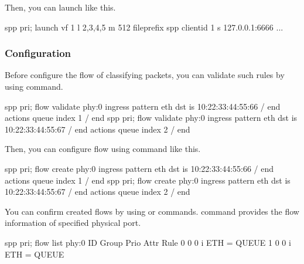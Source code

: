 \documentclass[a4paper,11pt,openany,oneside,english]{sphinxmanual}
\begin{document}
Then, you can launch  like this.

\begin{sphinxVerbatim}[commandchars=\\\{\},formatcom=\footnotesize]
spp \PYGZgt{} pri; launch vf 1 \PYGZhy{}l 2,3,4,5 \PYGZhy{}m 512 \PYGZhy{}\PYGZhy{}file\PYGZhy{}prefix spp \PYGZbs{}
\PYGZhy{}\PYGZhy{} \PYGZhy{}\PYGZhy{}client\PYGZhy{}id 1 \PYGZhy{}s 127.0.0.1:6666
...
\end{sphinxVerbatim}


\subsubsection{Configuration}
\label{\detokenize{usecases/hardware-offload:configuration}}
Before configure the flow of classifying packets, you
can validate such rules by using  command.

\begin{sphinxVerbatim}[commandchars=\\\{\},formatcom=\footnotesize]
spp \PYGZgt{} pri; flow validate phy:0 ingress pattern eth dst is \PYGZbs{}
10:22:33:44:55:66 / end actions queue index 1 / end
spp \PYGZgt{} pri; flow validate phy:0 ingress pattern eth dst is \PYGZbs{}
10:22:33:44:55:67 / end actions queue index 2 / end
\end{sphinxVerbatim}

Then, you can configure flow using  command like this.

\begin{sphinxVerbatim}[commandchars=\\\{\},formatcom=\footnotesize]
spp \PYGZgt{} pri; flow create phy:0 ingress pattern eth dst is \PYGZbs{}
10:22:33:44:55:66 / end actions queue index 1 / end
spp \PYGZgt{} pri; flow create phy:0 ingress pattern eth dst is \PYGZbs{}
10:22:33:44:55:67 / end actions queue index 2 / end
\end{sphinxVerbatim}

You can confirm created flows by using  or 
commands.  command provides the flow information of specified
physical port.

\begin{sphinxVerbatim}[commandchars=\\\{\},formatcom=\footnotesize]
spp \PYGZgt{} pri; flow list phy:0
ID      Group   Prio    Attr    Rule
0       0       0       i\PYGZhy{}\PYGZhy{}     ETH =\PYGZgt{} QUEUE
1       0       0       i\PYGZhy{}\PYGZhy{}     ETH =\PYGZgt{} QUEUE
\end{sphinxVerbatim}
\end{document}
